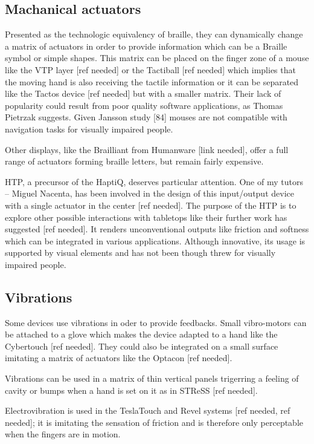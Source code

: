 \subsection{Machanical actuators}\label{machanical-actuators}

Presented as the technologic equivalency of braille,
they can dynamically change a matrix of actuators in order to provide information
which can be a Braille symbol or simple shapes. This matrix can be
placed on the finger zone of a mouse like the VTP layer {[}ref needed{]}
or the Tactiball {[}ref needed{]} which implies that the moving hand is
also receiving the tactile information or it can be separated like the
Tactos device {[}ref needed{]} but with a smaller matrix. Their lack of
popularity could result from poor quality software applications, as
Thomas Pietrzak suggests. Given Jansson study {[}84{]} mouses are not
compatible with navigation tasks for visually impaired people.

Other displays, like the Brailliant from Humanware {[}link needed{]},
offer a full range of actuators forming braille letters, but remain
fairly expensive.

HTP, a precursor of the HaptiQ, deserves particular attention. One of my
tutors -- Miguel Nacenta, has been involved in the design of this
input/output device with a single actuator in the center {[}ref
needed{]}. The purpose of the HTP is to explore other possible
interactions with tabletops like their further work has suggested {[}ref
needed{]}. It renders unconventional outputs like friction and softness
which can be integrated in various applications. Although innovative,
its usage is supported by visual elements and has not been though threw
for visually impaired people.

\subsection{Vibrations}\label{vibrations}

Some devices use vibrations in oder to provide feedbacks. Small
vibro-motors can be attached to a glove which makes the device adapted
to a hand like the Cybertouch {[}ref needed{]}. They could also be
integrated on a small surface imitating a matrix of actuators like the
Optacon {[}ref needed{]}.

Vibrations can be used in a matrix of thin vertical panels trigerring a
feeling of cavity or bumps when a hand is set on it as in STReSS {[}ref
needed{]}.

Electrovibration is used in the TeslaTouch and Revel systems {[}ref
needed, ref needed{]}; it is imitating the sensation of friction and is
therefore only perceptable when the fingers are in motion.

